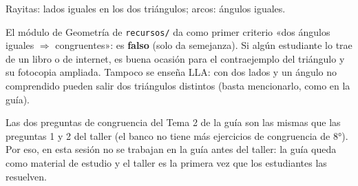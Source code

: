\documentclass[11pt]{article}
\begin{document}
\begin{center}

{\small Rayitas: lados iguales en los dos triángulos; arcos: ángulos iguales.}
\end{center}

\begin{nota}
El módulo de Geometría de \texttt{recursos/} da como primer criterio «dos ángulos iguales
$\Rightarrow$ congruentes»: es \textbf{falso} (solo da semejanza). Si algún estudiante lo
trae de un libro o de internet, es buena ocasión para el contraejemplo del triángulo y su
fotocopia ampliada. Tampoco se enseña LLA: con dos lados y un ángulo no comprendido pueden
salir dos triángulos distintos (basta mencionarlo, como en la guía).
\end{nota}

\begin{nota}
Las dos preguntas de congruencia del Tema 2 de la guía son las mismas que las preguntas 1 y
2 del taller (el banco no tiene más ejercicios de congruencia de 8°). Por eso, en esta
sesión no se trabajan en la guía antes del taller: la guía queda como material de estudio y
el taller es la primera vez que los estudiantes las resuelven.
\end{nota}
\end{document}

